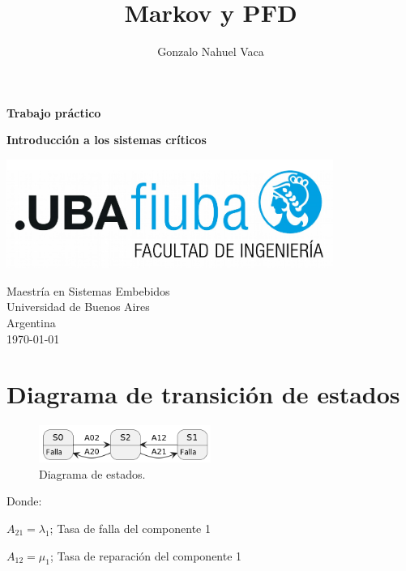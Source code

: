 \documentclass[
    11pt,
    spanish,
    a4paper
]{article}
\title{Markov y PFD}
\author{Gonzalo Nahuel Vaca}
\def\doctype{Trabajo práctico}
\begin{document}
\makeatletter
\begin{titlepage}
	\begin{center}
		\vspace*{1cm}

		\Huge
		\textbf{\doctype}
		\vspace{0.5cm}

		\LARGE
		\@title
		\vspace{0.5cm}

		\textbf{Introducción a los sistemas críticos}

		\vspace{1.5cm}

		\textbf{\@author}

		\vspace{1.5cm}

		\includegraphics[width=0.8\textwidth]{img/logoFIUBA.pdf}

		\vfill
		Maestría en Sistemas Embebidos\\
		Universidad de Buenos Aires\\
		Argentina\\
		\today
	\end{center}
\end{titlepage}
\makeatother
\newpage

\section{Diagrama de transición de estados}

\begin{figure}[htbp]
	\centering
	\includegraphics[width=0.5\textwidth]{img/diagrama_estados.png}
	\caption{Diagrama de estados.}
	\label{fig:diagrama_estados}
\end{figure}

Donde:

$ A_{21} = \lambda_1 $; Tasa de falla del componente 1

$ A_{12} = \mu_1 $; Tasa de reparación del componente 1
\end{document}
